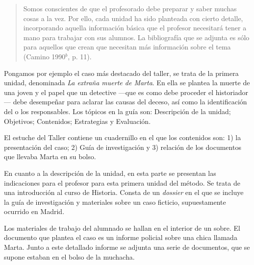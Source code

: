 \begin{quotation}
Somos conscientes de 
que el profesorado debe preparar y saber muchas cosas a la vez. Por 
ello, cada unidad ha sido planteada con cierto detalle, incorporando 
aquella información básica que el profesor necesitará tener a mano para 
trabajar con sus alumnos. La bibliografía que se adjunta es sólo para 
aquellos que crean que necesitan más información sobre el 
tema (Camino 1990$^b$, p. 11).
\end{quotation}
 
Pongamos por ejemplo el caso más destacado del taller, se trata de la 
primera unidad, denominada {\itshape La extraña muerte de Marta}. En ella 
se plantea la muerte de una joven y el papel que un detective ---que es como 
debe proceder el historiador--- debe desempeñar para aclarar las causas del 
deceso, así como la identificación del o los responsables. Los tópicos 
en la guía son: Descripción de la unidad; Objetivos; Contenidos; 
Estrategias y Evaluación.
 
El estuche del Taller contiene un cuadernillo en el que los contenidos 
son: 1) la presentación del caso; 2) Guía de investigación y 3) 
relación de los documentos que llevaba Marta en su bolso.

En cuanto a la descripción de la unidad, en esta parte se presentan las 
indicaciones para el profesor para esta primera unidad del método. Se trata 
de una introducción al curso de Historia. Consta de un {\itshape dossier} en 
el que se incluye la guía de investigación y materiales sobre un caso ficticio, 
supuestamente ocurrido en Madrid. 
 
Los materiales de trabajo del alumnado se hallan en el interior de un 
sobre. El documento que plantea el caso es un informe policial 
sobre una chica llamada Marta. Junto a este detallado informe se 
adjunta una serie de documentos, que se supone estaban en el bolso de 
la muchacha. 

